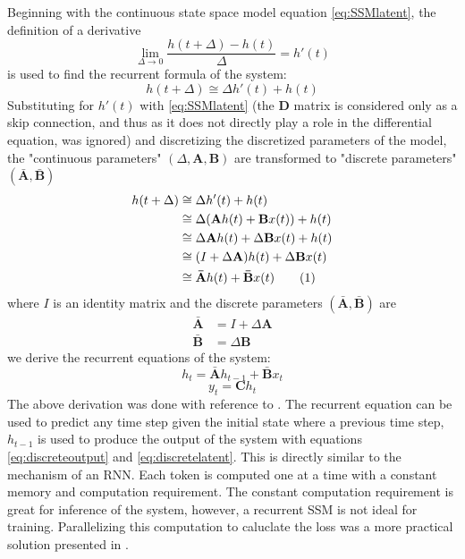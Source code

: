 \documentclass[conference]{IEEEtran}
\newcommand{\mbfb}[1]{\mathbf{\bar{{#1}}}}
\begin{document}
Beginning with the continuous state space model equation \eqref{eq:SSMlatent}, the definition of a derivative
\begin{equation*}
    \lim_{\Delta\to0} \frac{h(t+\Delta)-h(t)}{\Delta} = h'(t)
\end{equation*}
is used to find the recurrent formula of the system:
\begin{equation}
    h(t+\Delta) \cong \Delta h'(t) + h(t)
\end{equation}
Substituting for $h'(t)$ with \eqref{eq:SSMlatent} (the $\mathbf{D}$ matrix is considered only as a skip connection, and thus as it does not directly play a role in the differential equation, was ignored) and discretizing the discretized parameters of the model, the "continuous parameters" $(\Delta, \mathbf{A}, \mathbf{B})$ are transformed to "discrete parameters" $(\mbfb{A}, \mbfb{B})$
\newcommand\numberthis{\addtocounter{equation}{1}\tag{\theequation}}
\begin{align*}
    h(t+\Delta) & \cong \Delta h'(t) + h(t)                                              \\
                & \cong \Delta(\mathbf{A}h(t) + \mathbf{B}x(t)) + h(t)                   \\
                & \cong \Delta \mathbf{A}h(t) + \Delta \mathbf{B}x(t) + h(t)             \\
                & \cong (I + \Delta \mathbf{A})h(t) + \Delta \mathbf{B}x(t)              \\
                & \cong \mbfb{A}h(t) + \mbfb{B}x(t) \numberthis \label{eq:recurrentform}
\end{align*}
where $I$ is an identity matrix and the discrete parameters $(\mbfb{A}, \mbfb{B})$ are
\begin{align*}
    \mbfb{A} & = I + \Delta \mathbf{A} \\
    \mbfb{B} & = \Delta \mathbf{B}
\end{align*}
we derive the recurrent equations of the system:
\begin{equation}\label{eq:discretelatent}
    h_t = \mbfb{A}h_{t-1} + \mbfb{B}x_t
\end{equation}
\begin{equation}\label{eq:discreteoutput}
    y_t = \mathbf{C}h_t
\end{equation}
The above derivation was done with reference to \cite{Jamil}.
The recurrent equation can be used to predict any time step given the initial state where a previous time step, $h_{t-1}$ is used to produce the output of the system with equations \eqref{eq:discreteoutput} and \eqref{eq:discretelatent}. This is directly similar to the mechanism of an RNN. Each token is computed one at a time with a constant memory and computation requirement. The constant computation requirement is great for inference of the system, however, a recurrent SSM is not ideal for training. Parallelizing this computation to caluclate the loss was a more practical solution presented in \cite{gu2022efficiently}.
\end{document}
